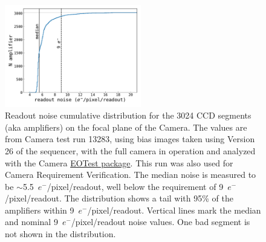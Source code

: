 \documentclass[PST,authoryear,toc]{lsstdoc}
\begin{document}
\FloatBarrier
\begin{figure}[!ht]
\centering
\includegraphics[width=0.53\textwidth]{figures/ampnoise.pdf}
\caption{Readout noise cumulative distribution for the 3024 CCD segments (aka amplifiers) on the focal plane of the Camera. The values are from Camera test run 13283, using bias images taken using Version 26 of the sequencer, with the full camera in operation and analyzed with the Camera \href{https://github.com/lsst-camera-dh/eotest}{EOTest package}. This run was also used for Camera Requirement Verification. The median noise is measured to be $\sim$5.5~$e^-$/pixel/readout, well below the requirement of 9~$e^-$/pixel/readout. The distribution shows a tail with 95\% of the amplifiers within 9~$e^-$/pixel/readout. Vertical lines mark the median and nominal 9~$e^-$/pixel/readout noise values. One bad segment is not shown in the distribution.}\label{fig:rndist}
\end{figure}


\FloatBarrier
 \FloatBarrier
\end{document}
